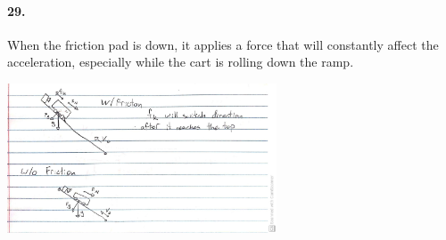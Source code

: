     \paragraph*{29.}

    \begin{mdframed}
        When the friction pad is down, it applies a force that will constantly affect the acceleration, especially while the cart is rolling down the ramp.

        \centering\includegraphics[angle=90,origin=c,width=0.6\textwidth]{image4}
    \end{mdframed}

